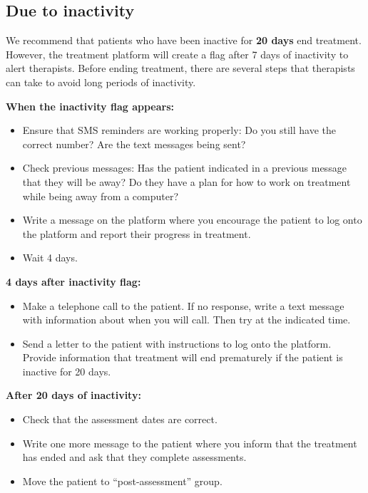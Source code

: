 \documentclass[]{book}
\providecommand{\tightlist}{%
  \setlength{\itemsep}{0pt}\setlength{\parskip}{0pt}}
\theoremstyle{definition}
\theoremstyle{definition}
\theoremstyle{definition}
\theoremstyle{remark}
\begin{document}
\hypertarget{due-to-inactivity}{%
\subsection{Due to inactivity}\label{due-to-inactivity}}

We recommend that patients who have been inactive for \textbf{20 days}
end treatment. However, the treatment platform will create a flag after
7 days of inactivity to alert therapists. Before ending treatment, there
are several steps that therapists can take to avoid long periods of
inactivity.

\textbf{When the inactivity flag appears:}

\begin{itemize}
\tightlist
\item
  Ensure that SMS reminders are working properly: Do you still have the
  correct number? Are the text messages being sent?\\
\item
  Check previous messages: Has the patient indicated in a previous
  message that they will be away? Do they have a plan for how to work on
  treatment while being away from a computer?\\
\item
  Write a message on the platform where you encourage the patient to log
  onto the platform and report their progress in treatment.\\
\item
  Wait 4 days.
\end{itemize}

\textbf{4 days after inactivity flag:}

\begin{itemize}
\tightlist
\item
  Make a telephone call to the patient. If no response, write a text
  message with information about when you will call. Then try at the
  indicated time.\\
\item
  Send a letter to the patient with instructions to log onto the
  platform. Provide information that treatment will end prematurely if
  the patient is inactive for 20 days.
\end{itemize}

\textbf{After 20 days of inactivity:}

\begin{itemize}
\tightlist
\item
  Check that the assessment dates are correct.\\
\item
  Write one more message to the patient where you inform that the
  treatment has ended and ask that they complete assessments.\\
\item
  Move the patient to ``post-assessment'' group.
\end{itemize}
\end{document}
